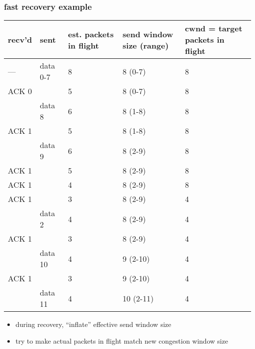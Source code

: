 \begin{frame}
\frametitle{fast recovery example}
{\fontsize{9}{10}\selectfont
\begin{tabular}{lllll}
recv'd & sent & est. packets in flight & send window size (range) & cwnd = target packets in flight\\ \hline
--- & data 0-7 & 8 & 8 (0-7) & 8\\
ACK 0 & ~ & 5 & 8 (0-7) & 8 \\
~ & data 8 & 6 & 8 (1-8) & 8\\
ACK 1 & ~ & 5  & 8 (1-8) & 8\\
~ & data 9 & 6 & 8 (2-9) & 8\\
ACK 1 & ~  & 5 & 8 (2-9) & 8\\
ACK 1 & ~  & 4 & 8 (2-9) & 8\\
ACK 1 & ~ & 3 &  8 (2-9) & 4 \\
~ & data 2 & 4 & 8 (2-9) & 4\\
ACK 1 & ~ & 3 &  8 (2-9) & 4 \\
~ & data 10 & 4 & 9 (2-10) & 4\\
ACK 1 & ~ & 3 &  9 (2-10) & 4 \\
~ & data 11 & 4 &  10 (2-11) & 4 \\
\end{tabular}
}
\begin{itemize}
    \item during recovery, ``inflate'' effective send window size
    \item try to make actual packets in flight match new congestion window size
\end{itemize}
\end{frame}
